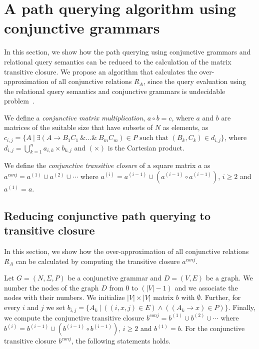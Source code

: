 \section{A path querying algorithm using conjunctive grammars}
In this section, we show how the path querying using conjunctive grammars and relational query semantics can be reduced to the calculation of the matrix transitive closure. We propose an algorithm that calculates the over-approximation of all conjunctive relations $R_A$, since the query evaluation using the relational query semantics and conjunctive grammars is undecidable problem~\cite{hellingsRelational}.

We define a \textit{conjunctive matrix multiplication}, $a \circ b = c$, where $a$ and $b$ are matrices of the suitable size that have subsets of $N$ as elements, as $c_{i,j} = \{A~|~\exists (A \rightarrow B_1 C_1~\& \ldots \&~B_m C_m) \in P \text{ such that } (B_k, C_k) \in d_{i,j} \}$, where $d_{i,j} = \bigcup^{n}_{k=1}{a_{i,k} \times b_{k,j}}$ and $(\times)$ is the Cartesian product. 

We define the \textit{conjunctive transitive closure} of a square matrix $a$ as $a^{conj} = a^{(1)} \cup a^{(2)} \cup \cdots$ where $a^{(i)} = a^{(i-1)} \cup (a^{(i-1)} \circ a^{(i-1)})$, $i \ge 2$ and $a^{(1)} = a$.

\subsection{Reducing conjunctive path querying to transitive closure} \label{section_reducing_conj}
In this section, we show how the over-approximation of all conjunctive relations $R_A$ can be calculated by computing the transitive closure $a^{conj}$.

Let $G = (N,\Sigma,P)$ be a conjunctive grammar and $D = (V, E)$ be a graph. We number the nodes of the graph $D$ from 0 to $(|V| - 1)$ and we associate the nodes with their numbers. We initialize $|V| \times |V|$ matrix $b$ with $\emptyset$. Further, for every $i$ and $j$ we set $b_{i,j} = \{A_k~|~((i,x,j) \in E) \wedge ((A_k \rightarrow x) \in P)\}$. Finally, we compute the conjunctive transitive closure $b^{conj} = b^{(1)} \cup b^{(2)} \cup \cdots$ where $b^{(i)} = b^{(i-1)} \cup (b^{(i-1)} \circ b^{(i-1)})$, $i \ge 2$ and $b^{(1)} = b$. For the conjunctive transitive closure $b^{conj}$, the following statements holds.

